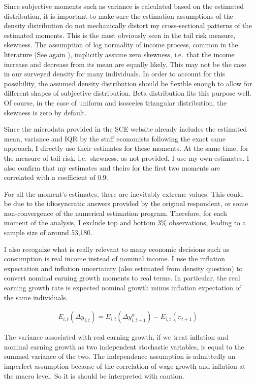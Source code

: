 Since subjective moments such as variance is calculated based on the
estimated distribution, it is important to make sure the estimation
assumptions of the density distribution do not mechanically distort my
cross-sectional patterns of the estimated moments. This is the most
obviously seen in the tail risk measure, skewness. The assumption of log
normality of income process, common in the literature (See again
\cite{blundell_consumption_2008}), implicitly assume zero skewness,
i.e.~that the income increase and decrease from its mean are equally
likely. This may not be the case in our surveyed density for many
individuals. In order to account for this possibility, the assumed
density distribution should be flexible enough to allow for different
shapes of subjective distribution. Beta distribution fits this purpose
well. Of course, in the case of uniform and isosceles triangular
distribution, the skewness is zero by default.

Since the microdata provided in the SCE website already includes the
estimated mean, variance and IQR by the staff economists following the
exact same approach, I directly use their estimates for these moments.
At the same time, for the measure of tail-risk, i.e.~skewness, as not
provided, I use my own estimates. I also confirm that my estimates and
theirs for the first two moments are correlated with a coefficient of
0.9.

For all the moment's estimates, there are inevitably extreme values.
This could be due to the idiosyncratic answers provided by the original
respondent, or some non-convergence of the numerical estimation program.
Therefore, for each moment of the analysis, I exclude top and bottom
\(3\%\) observations, leading to a sample size of around 53,180.

I also recognize what is really relevant to many economic decisions such
as consumption is real income instead of nominal income. I use the inflation expectation and inflation uncertainty (also estimated
from density question) to convert nominal earning growth moments to real
terms. In particular, the real
earning growth rate is expected nominal growth minus inflation
expectation of the same individuals.

\begin{eqnarray}
E_{i,t}({\Delta y}_{i,t}) = E_{i,t}(\Delta y^n_{i,t+1}) - E_{i,t}(\pi_{t+1})
\end{eqnarray}

The variance associated with real earning growth, if we treat inflation
and nominal earning growth as two independent stochastic variables, is
equal to the summed variance of the two. The independence assumption is
admittedly an imperfect assumption because of the correlation of wage
growth and inflation at the macro level. So it is should be interpreted
with caution.

